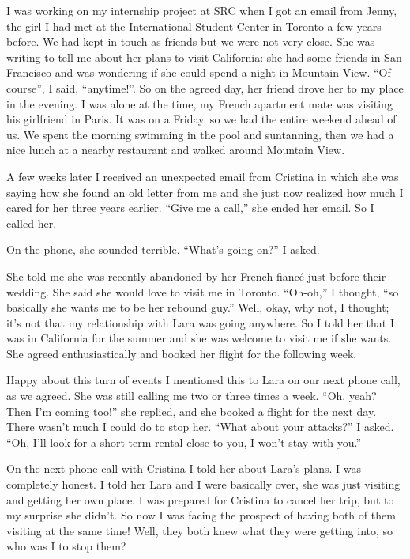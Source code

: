 \documentclass[12pt]{book}
\begin{document}
I was working on my internship project at SRC when I got an email from
Jenny, the girl I had met at the International Student Center in Toronto
a few years before. We had kept in touch as friends but we were not very
close. She was writing to tell me about her plans to visit California:
she had some friends in San Francisco and was wondering if she could
spend a night in Mountain View. ``Of course'', I said, ``anytime!''. So
on the agreed day, her friend drove her to my place in the evening. I
was alone at the time, my French apartment mate was visiting his
girlfriend in Paris. It was on a Friday, so we had the entire weekend
ahead of us. We spent the morning swimming in the pool and suntanning,
then we had a nice lunch at a nearby restaurant and walked around
Mountain View.

A few weeks later I received an unexpected email from Cristina in which
she was saying how she found an old letter from me and she just now
realized how much I cared for her three years earlier. ``Give me a
call,'' she ended her email. So I called her.

On the phone, she sounded terrible. ``What's going on?'' I asked.

She told me she was recently abandoned by her French fiancé just before
their wedding. She said she would love to visit me in Toronto.
``Oh-oh,'' I thought, ``so basically she wants me to be her rebound
guy.'' Well, okay, why not, I thought; it's not that my relationship
with Lara was going anywhere. So I told her that I was in California for
the summer and she was welcome to visit me if she wants. She agreed
enthusiastically and booked her flight for the following week.

Happy about this turn of events I mentioned this to Lara on our next
phone call, as we agreed. She was still calling me two or three times a
week. ``Oh, yeah? Then I'm coming too!'' she replied, and she booked a
flight for the next day. There wasn't much I could do to stop her.
``What about your attacks?'' I asked. ``Oh, I'll look for a short-term
rental close to you, I won't stay with you.''

On the next phone call with Cristina I told her about Lara's plans. I
was completely honest. I told her Lara and I were basically over, she
was just visiting and getting her own place. I was prepared for Cristina
to cancel her trip, but to my surprise she didn't. So now I was facing
the prospect of having both of them visiting at the same time! Well,
they both knew what they were getting into, so who was I to stop them?
\end{document}
